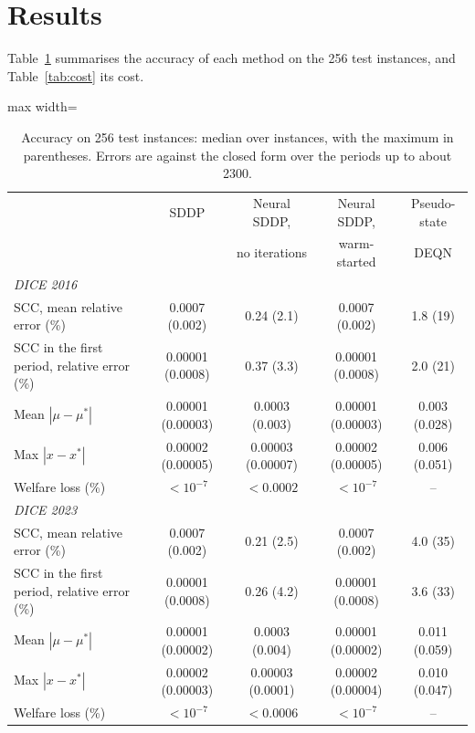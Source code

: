 \section{Results}
\label{sec:results}

Table~\ref{tab:accuracy} summarises the accuracy of each method on the 256 test instances, and Table~\ref{tab:cost} its cost.

\begin{table}[t]
\centering
\caption{Accuracy on 256 test instances: median over instances, with the maximum in parentheses. Errors are against the closed form over the periods up to about 2300.}
\label{tab:accuracy}
\begin{adjustbox}{max width=\textwidth}
\begin{tabular}{lcccc}
\toprule
 & SDDP & Neural SDDP, & Neural SDDP, & Pseudo-state \\
 & & no iterations & warm-started & DEQN \\
\midrule
\multicolumn{5}{l}{\textit{DICE 2016}} \\
SCC, mean relative error (\%) & 0.0007 (0.002) & 0.24 (2.1) & 0.0007 (0.002) & 1.8 (19) \\
SCC in the first period, relative error (\%) & 0.00001 (0.0008) & 0.37 (3.3) & 0.00001 (0.0008) & 2.0 (21) \\
Mean $|\mu - \mu^*|$ & 0.00001 (0.00003) & 0.0003 (0.003) & 0.00001 (0.00003) & 0.003 (0.028) \\
Max $|x - x^*|$ & 0.00002 (0.00005) & 0.00003 (0.00007) & 0.00002 (0.00005) & 0.006 (0.051) \\
Welfare loss (\%) & $<10^{-7}$ & $<0.0002$ & $<10^{-7}$ & -- \\
\midrule
\multicolumn{5}{l}{\textit{DICE 2023}} \\
SCC, mean relative error (\%) & 0.0007 (0.002) & 0.21 (2.5) & 0.0007 (0.002) & 4.0 (35) \\
SCC in the first period, relative error (\%) & 0.00001 (0.0008) & 0.26 (4.2) & 0.00001 (0.0008) & 3.6 (33) \\
Mean $|\mu - \mu^*|$ & 0.00001 (0.00002) & 0.0003 (0.004) & 0.00001 (0.00002) & 0.011 (0.059) \\
Max $|x - x^*|$ & 0.00002 (0.00003) & 0.00003 (0.0001) & 0.00002 (0.00004) & 0.010 (0.047) \\
Welfare loss (\%) & $<10^{-7}$ & $<0.0006$ & $<10^{-7}$ & -- \\
\bottomrule
\end{tabular}
\end{adjustbox}
\end{table}

